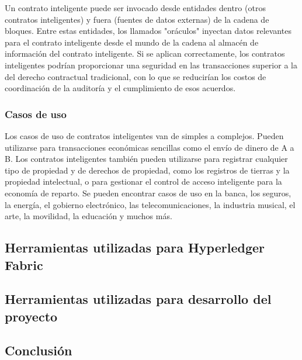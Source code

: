 Un contrato inteligente puede ser invocado desde entidades dentro (otros contratos inteligentes) y fuera (fuentes de datos externas) de la cadena de bloques. Entre estas entidades, los llamados "oráculos" inyectan datos relevantes para el contrato inteligente desde el mundo de la cadena al almacén de información del contrato inteligente. Si se aplican correctamente, los contratos inteligentes podrían proporcionar una seguridad en las transacciones superior a la del derecho contractual tradicional, con lo que se reducirían los costos de coordinación de la auditoría y el cumplimiento de esos acuerdos. 

\subsubsection*{Casos de uso}

Los casos de uso de contratos inteligentes van de simples a complejos. Pueden utilizarse para transacciones económicas sencillas como el envío de dinero de A a B. Los contratos inteligentes también pueden utilizarse para registrar cualquier tipo de propiedad y de derechos de propiedad, como los registros de tierras y la propiedad intelectual, o para gestionar el control de acceso inteligente para la economía de reparto. Se pueden encontrar casos de uso en la banca, los seguros, la energía, el gobierno electrónico, las telecomunicaciones, la industria musical, el arte, la movilidad, la educación y muchos más.

\subsection{Herramientas utilizadas para Hyperledger Fabric}

\subsection{Herramientas utilizadas para desarrollo del proyecto}

\subsection{Conclusión}

\newpage